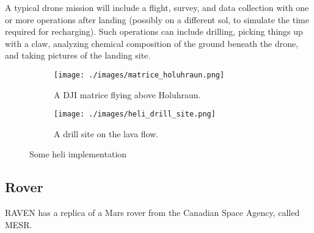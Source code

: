 A typical drone mission will include a flight, survey, and data collection with one or more operations
after landing (possibly on a different sol, to simulate the time required for recharging).
Such operations can include drilling, picking things up with a claw, analyzing chemical composition
of the ground beneath the drone, and taking pictures of the landing site.

\begin{figure}
	\centering
	\begin{subfigure}{0.49\textwidth}
	\texttt{[image: ./images/matrice\_holuhraun.png]}
	\caption{A DJI matrice flying above Holuhraun.}
	\label{figure:matrice_holuhraun}
	\end{subfigure}
	\centering
	\begin{subfigure}{0.49\textwidth}
	\texttt{[image: ./images/heli\_drill\_site.png]}
	\caption{A drill site on the lava flow.}
	\label{figure:heli_drill_site}
	\end{subfigure}
	\caption{Some heli implementation}
	\label{figure:heli_implementation}
\end{figure}

\subsection{Rover}
RAVEN has a replica of a Mars rover from the Canadian Space Agency, called MESR.

